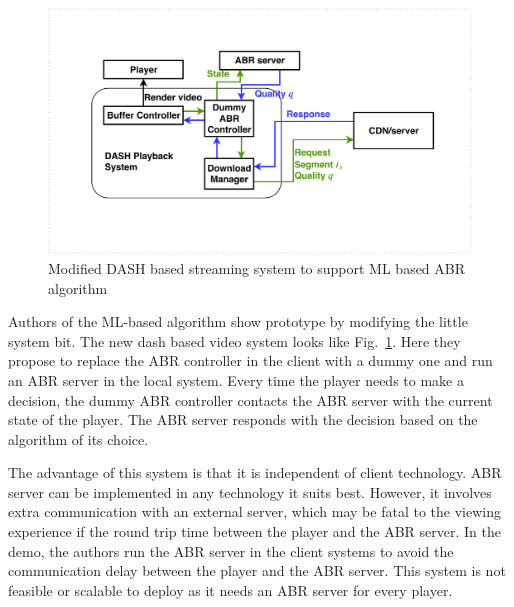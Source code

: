 \begin{figure}[ht]
	\begin{center}
		\includegraphics[width=0.7\linewidth]{img/playerDiagram_ml}
	\end{center}
	\caption{\label{fig:playerDiagram_ml} Modified DASH based streaming system to support ML based ABR algorithm}
\end{figure}

Authors of the ML-based algorithm show prototype by modifying the little system bit. The new dash based video system looks like Fig.~\ref{fig:playerDiagram_ml}. Here they propose to replace the ABR controller in the client with a dummy one and run an ABR server in the local system. Every time the player needs to make a decision, the dummy ABR controller contacts the ABR server with the current state of the player. The ABR server responds with the decision based on the algorithm of its choice.

The advantage of this system is that it is independent of client technology. ABR server can be implemented in any technology it suits best. However, it involves extra communication with an external server, which may be fatal to the viewing experience if the round trip time between the player and the ABR server. In the demo, the authors run the ABR server in the client systems to avoid the communication delay between the player and the ABR server. This system is not feasible or scalable to deploy as it needs an ABR server for every player.
